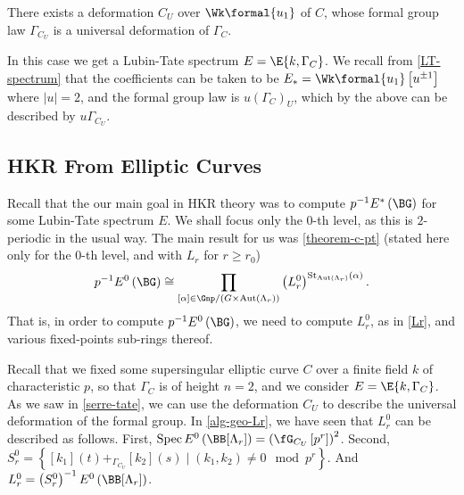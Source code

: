 \begin{theorem}\label{serre-tate}
	There exists a deformation $C_U$ over $\Wk\formal{u_1}$ of $C$, whose formal group law $\Gamma_{C_U}$ is a universal deformation of $\Gamma_C$.
\end{theorem}

In this case we get a Lubin-Tate spectrum $E = \E{k, \Gamma_C}$.
We recall from \cref{LT-spectrum} that the coefficients can be taken to be $E_* = \Wk\formal{u_1}\left[u^{\pm 1}\right]$ where $\left|u\right| = 2$, and the formal group law is $u\left(\Gamma_C\right)_U$, which by the above can be described by $u \Gamma_{C_U}$.



\subsection{HKR From Elliptic Curves}

Recall that the our main goal in HKR theory was to compute $p^{-1} E^*\left(\BG\right)$ for some Lubin-Tate spectrum $E$.
We shall focus only the $0$-th level, as this is $2$-periodic in the usual way.
The main result for us was \cref{theorem-c-pt} (stated here only for the $0$-th level, and with $L_r$ for $r \geq r_0$)
$$
p^{-1} E^0\left(\BG\right)
\cong \prod_{\left[\alpha\right] \in \Gnp/{\left(G \times \aut \left(\Lambda_r\right)\right)}}
\left(L_r^0\right)^{\stab_{\aut \left(\Lambda_r\right)}\left(\alpha\right)}.
$$
That is, in order to compute $p^{-1} E^0\left(\BG\right)$, we need to compute $L_r^0$, as in \cref{Lr}, and various fixed-points sub-rings thereof.

Recall that we fixed some supersingular elliptic curve $C$ over a finite field $k$ of characteristic $p$, so that $\Gamma_C$ is of height $n=2$, and we consider $E = \E{k, \Gamma_C}$.
As we saw in \cref{serre-tate}, we can use the deformation $C_U$ to describe the universal deformation of the formal group.
In \cref{alg-geo-Lr}, we have seen that $L_r^0$ can be described as follows.
First, $\spec E^0\left(\BB[\Lambda_r]\right) = \left(\fG_{C_U}\left[p^r\right]\right)^2$.
Second, $S_r^0 = \left\{ [k_1]\left(t\right) +_{\Gamma_{C_U}} [k_2]\left(s\right) \mid \left(k_1, k_2\right) \neq 0 \mod p^r\right\}$.
And $L_r^0 = \left(S_r^0\right)^{-1} E^0\left(\BB[\Lambda_r]\right)$.

